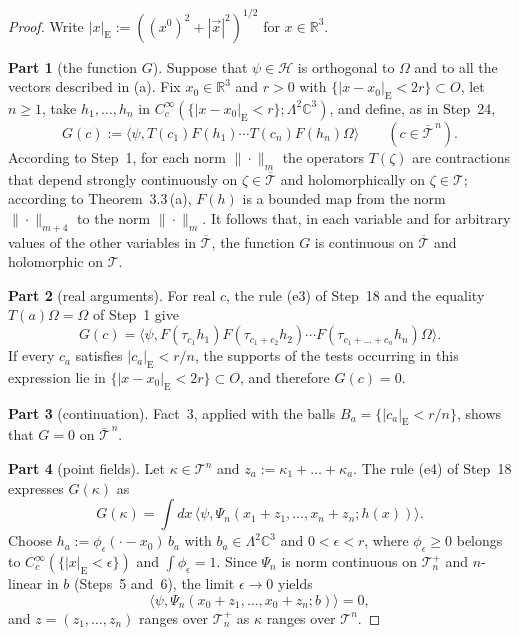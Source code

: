 \documentclass[11pt,letterpaper,reqno]{amsart}
\theoremstyle{definition}
\begin{document}
\begin{proof}
Write $|x|_{\mathrm E}:=((x^0)^2+|\vec x|^2)^{1/2}$ for $x\in\mathbb R^3$.

\textbf{Part 1} (the function $G$).
Suppose that $\psi\in\mathcal H$ is orthogonal to $\Omega$ and to all the vectors described in (a).
Fix $x_0\in\mathbb R^3$ and $r>0$ with $\{|x-x_0|_{\mathrm E}<2r\}\subset O$, let $n\ge1$, take $h_1,\dots,h_n$ in $C_c^\infty(\{|x-x_0|_{\mathrm E}<r\};\Lambda^2\mathbb C^3)$, and define, as in Step~24,
\begin{equation*}
G(c):=\langle\psi,T(c_1)F(h_1)\cdots T(c_n)F(h_n)\Omega\rangle\qquad(c\in\overline{\mathcal T}^{\,n}).
\end{equation*}
According to Step~1, for each norm $\|\cdot\|_m$ the operators $T(\zeta)$ are contractions that depend strongly continuously on $\zeta\in\overline{\mathcal T}$ and holomorphically on $\zeta\in\mathcal T$; according to Theorem~3.3\,(a), $F(h)$ is a bounded map from the norm $\|\cdot\|_{m+4}$ to the norm $\|\cdot\|_m$.
It follows that, in each variable and for arbitrary values of the other variables in $\overline{\mathcal T}$, the function $G$ is continuous on $\overline{\mathcal T}$ and holomorphic on $\mathcal T$.

\textbf{Part 2} (real arguments).
For real $c$, the rule (e3) of Step~18 and the equality $T(a)\Omega=\Omega$ of Step~1 give
\begin{equation*}
G(c)=\langle\psi,F(\tau_{c_1}h_1)F(\tau_{c_1+c_2}h_2)\cdots F(\tau_{c_1+\dots+c_n}h_n)\Omega\rangle.
\end{equation*}
If every $c_a$ satisfies $|c_a|_{\mathrm E}<r/n$, the supports of the tests occurring in this expression lie in $\{|x-x_0|_{\mathrm E}<2r\}\subset O$, and therefore $G(c)=0$.

\textbf{Part 3} (continuation).
Fact~3, applied with the balls $B_a=\{|c_a|_{\mathrm E}<r/n\}$, shows that $G=0$ on $\overline{\mathcal T}^{\,n}$.

\textbf{Part 4} (point fields).
Let $\kappa\in\mathcal T^n$ and $z_a:=\kappa_1+\dots+\kappa_a$.
The rule (e4) of Step~18 expresses $G(\kappa)$ as
\begin{equation*}
G(\kappa)=\int dx\,\langle\psi,\Psi_n(x_1+z_1,\dots,x_n+z_n;h(x))\rangle.
\end{equation*}
Choose $h_a:=\phi_\epsilon(\cdot-x_0)\,b_a$ with $b_a\in\Lambda^2\mathbb C^3$ and $0<\epsilon<r$, where $\phi_\epsilon\ge0$ belongs to $C_c^\infty(\{|x|_{\mathrm E}<\epsilon\})$ and $\int\phi_\epsilon=1$.
Since $\Psi_n$ is norm continuous on $\mathcal T_n^+$ and $n$-linear in $b$ (Steps~5 and~6), the limit $\epsilon\to0$ yields
\begin{equation*}
\langle\psi,\Psi_n(x_0+z_1,\dots,x_0+z_n;b)\rangle=0,
\end{equation*}
and $z=(z_1,\dots,z_n)$ ranges over $\mathcal T_n^+$ as $\kappa$ ranges over $\mathcal T^n$.


\end{proof}
\end{document}
